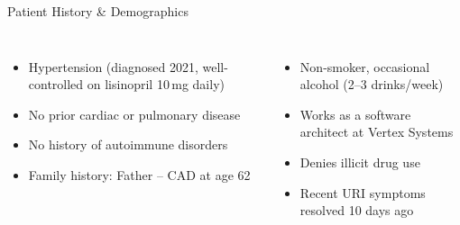\begin{frame}{Patient History \& Demographics}
  \vspace{0.3cm}

  \begin{tcolorbox}[infobox,title={\faHistory\hspace{4pt}Past Medical \& Social History}]
    \small
    \begin{columns}[T]
      \begin{itemize}
        \item Hypertension (diagnosed 2021, well-controlled on lisinopril 10\,mg daily)
        \item No prior cardiac or pulmonary disease
        \item No history of autoimmune disorders
        \item Family history: Father -- CAD at age 62
      \end{itemize}
      \begin{itemize}
        \item Non-smoker, occasional alcohol (2--3 drinks/week)
        \item Works as a software architect at Vertex Systems
        \item Denies illicit drug use
        \item Recent URI symptoms resolved 10 days ago
      \end{itemize}
    \end{columns}
  \end{tcolorbox}
\end{frame}
